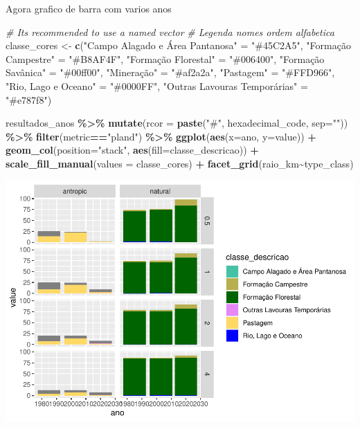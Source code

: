 \documentclass[
]{article}
\newenvironment{Shaded}{\begin{snugshade}}{\end{snugshade}}
\newcommand{\AttributeTok}[1]{\textcolor[rgb]{0.13,0.29,0.53}{#1}}
\newcommand{\CommentTok}[1]{\textcolor[rgb]{0.56,0.35,0.01}{\textit{#1}}}
\newcommand{\FunctionTok}[1]{\textcolor[rgb]{0.13,0.29,0.53}{\textbf{#1}}}
\newcommand{\NormalTok}[1]{#1}
\newcommand{\OtherTok}[1]{\textcolor[rgb]{0.56,0.35,0.01}{#1}}
\newcommand{\SpecialCharTok}[1]{\textcolor[rgb]{0.81,0.36,0.00}{\textbf{#1}}}
\newcommand{\StringTok}[1]{\textcolor[rgb]{0.31,0.60,0.02}{#1}}
\begin{document}
Agora grafico de barra com varios anos

\begin{Shaded}
\begin{Highlighting}[]
\CommentTok{\# It\textquotesingle{}s recommended to use a named vector}
\CommentTok{\# Legenda nomes ordem alfabetica}
\NormalTok{classe\_cores }\OtherTok{\textless{}{-}} \FunctionTok{c}\NormalTok{(}\StringTok{"Campo Alagado e Área Pantanosa"} \OtherTok{=} \StringTok{"\#45C2A5"}\NormalTok{, }
\StringTok{"Formação Campestre"} \OtherTok{=} \StringTok{"\#B8AF4F"}\NormalTok{, }
\StringTok{"Formação Florestal"} \OtherTok{=} \StringTok{"\#006400"}\NormalTok{, }
\StringTok{"Formação Savânica"} \OtherTok{=} \StringTok{"\#00ff00"}\NormalTok{, }
\StringTok{"Mineração"} \OtherTok{=} \StringTok{"\#af2a2a"}\NormalTok{, }
\StringTok{"Pastagem"} \OtherTok{=} \StringTok{"\#FFD966"}\NormalTok{, }
\StringTok{"Rio, Lago e Oceano"} \OtherTok{=} \StringTok{"\#0000FF"}\NormalTok{,}
\StringTok{"Outras Lavouras Temporárias"} \OtherTok{=} \StringTok{"\#e787f8"}\NormalTok{) }

\NormalTok{resultados\_anos }\SpecialCharTok{\%\textgreater{}\%} 
  \FunctionTok{mutate}\NormalTok{(}\AttributeTok{rcor =} \FunctionTok{paste}\NormalTok{(}\StringTok{"\#"}\NormalTok{, hexadecimal\_code, }\AttributeTok{sep=}\StringTok{""}\NormalTok{)) }\SpecialCharTok{\%\textgreater{}\%} 
  \FunctionTok{filter}\NormalTok{(metric}\SpecialCharTok{==}\StringTok{"pland"}\NormalTok{) }\SpecialCharTok{\%\textgreater{}\%}
  \FunctionTok{ggplot}\NormalTok{(}\FunctionTok{aes}\NormalTok{(}\AttributeTok{x=}\NormalTok{ano, }\AttributeTok{y=}\NormalTok{value)) }\SpecialCharTok{+} 
  \FunctionTok{geom\_col}\NormalTok{(}\AttributeTok{position=}\StringTok{"stack"}\NormalTok{, }\FunctionTok{aes}\NormalTok{(}\AttributeTok{fill=}\NormalTok{classe\_descricao)) }\SpecialCharTok{+} 
  \FunctionTok{scale\_fill\_manual}\NormalTok{(}\AttributeTok{values =}\NormalTok{ classe\_cores) }\SpecialCharTok{+}
  \FunctionTok{facet\_grid}\NormalTok{(raio\_km}\SpecialCharTok{\textasciitilde{}}\NormalTok{type\_class)}
\end{Highlighting}
\end{Shaded}

\includegraphics{epr_files/figure-latex/unnamed-chunk-74-1.pdf}
\end{document}
